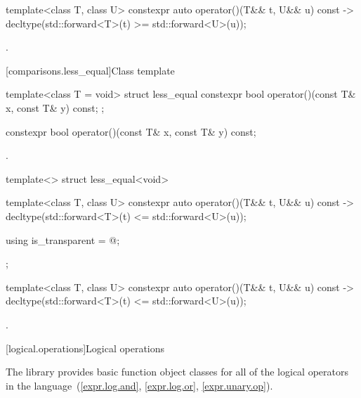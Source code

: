 %
\begin{itemdecl}
template<class T, class U> constexpr auto operator()(T&& t, U&& u) const
    -> decltype(std::forward<T>(t) >= std::forward<U>(u));
\end{itemdecl}

\begin{itemdescr}
\pnum\returns {}.
\end{itemdescr}

[comparisons.less_equal]{Class template }

%
\begin{itemdecl}
template<class T = void> struct less_equal {
  constexpr bool operator()(const T& x, const T& y) const;
};
\end{itemdecl}

%
\begin{itemdecl}
constexpr bool operator()(const T& x, const T& y) const;
\end{itemdecl}

\begin{itemdescr}
\pnum\returns {}.
\end{itemdescr}

%
\begin{itemdecl}
template<> struct less_equal<void> {
  template<class T, class U> constexpr auto operator()(T&& t, U&& u) const
    -> decltype(std::forward<T>(t) <= std::forward<U>(u));

  using is_transparent = @\unspec@;
};
\end{itemdecl}

%
\begin{itemdecl}
template<class T, class U> constexpr auto operator()(T&& t, U&& u) const
    -> decltype(std::forward<T>(t) <= std::forward<U>(u));
\end{itemdecl}

\begin{itemdescr}
\pnum\returns {}.
\end{itemdescr}


[logical.operations]{Logical operations}

\pnum
The library provides basic function object classes for all of the logical
operators in the language~(\ref{expr.log.and}, \ref{expr.log.or}, \ref{expr.unary.op}).

